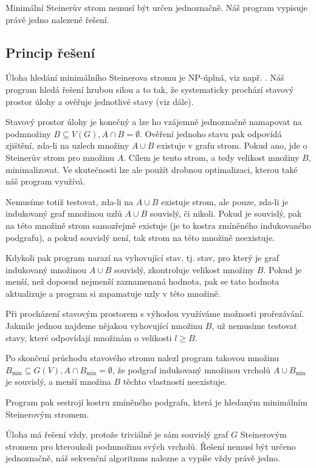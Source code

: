 \documentclass[12pt]{article}
\theoremstyle{definition}
\begin{document}
Minimální Steinerův strom nemusí být určen jednoznačně. Náš program vypisuje právě jedno nalezené řešení.
\subsection{Princip řešení}\label{subPrincip}
Úloha hledání minimálního Steinerova stromu je NP-úplná, viz např. \cite{npc}.
Náš program hledá řešení hrubou silou a to tak, že systematicky prochází
stavový prostor úlohy a ověřuje jednotlivé stavy (viz dále).

Stavový prostor úlohy je konečný a lze ho vzájemně jednoznačně namapovat na podmnožiny $B\subseteq V(G), A\cap B = \emptyset$.
Ověření jednoho stavu pak odpovídá zjištění, zda-li na uzlech množiny $A\cup B$ existuje
v grafu strom. Pokud ano, jde o Steinerův strom pro množinu $A$. Cílem je tento strom, a tedy velikost
množiny $B$, minimalizovat. Ve skutečnosti lze ale použít drobnou optimalizaci, kterou
také náš program využívá.

Nemusíme totiž testovat, zda-li na $A\cup B$ existuje strom, ale pouze,
zda-li je indukovaný graf množinou uzlů $A\cup B$ souvislý, či nikoli. Pokud je
souvislý, pak na této množině strom samozřejmě existuje (je to kostra zmíněného indukovaného podgrafu), a pokud souvislý není, tak strom na této množině neexistuje.

Kdykoli pak program narazí na vyhovující stav, tj. stav, pro který je graf indukovaný množinou $A\cup B$ souvislý, zkontroluje velikost množiny $B$. Pokud je menší, než doposud nejmenší zaznamenaná hodnota, pak se tato hodnota aktualizuje a program si
zapamatuje uzly v této množině.

Při procházení stavovým prostorem s výhodou využíváme možnosti prořezávání. Jakmile
jednou najdeme nějakou vyhovující množinu $B$, už nemusíme testovat stavy, které odpovídají množinám o velikosti $l \geq B$.

Po skončení průchodu stavového stromu nalezl program takovou množinu $B_{\min}\subseteq G(V), A\cap B_{\min} = \emptyset$, že podgraf indukovaný množinou vrcholů $A\cup B_{\min}$ je souvislý, a menší množina $B$ těchto vlastností neexistuje.

Program pak sestrojí kostru zmíněného podgrafu, která je hledaným minimálním Steinerovým stromem.

Úloha má řešení vždy, protože triviálně je sám souvislý graf $G$ Steinerovým stromem pro kteroukoli podmnožinu svých vrcholů. Řešení nemusí být určeno jednoznačně, náš sekvenční algoritmus nalezne a vypíše vždy právě jedno.
\end{document}
